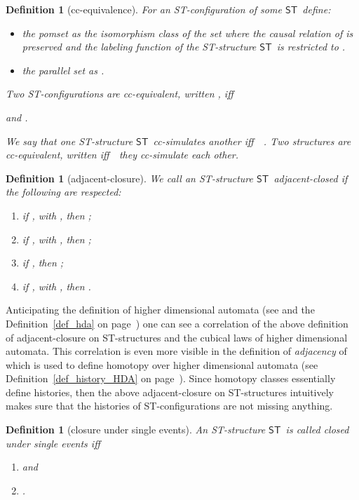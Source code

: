 \documentclass[submission,copyright,creativecommons]{eptcs}
\newtheorem{definition}[theorem]{Definition}
\newcommand\ST{\ensuremath{\mathsf{ST}}}
\newcommand\ststruct{\ensuremath{\ST}}
\begin{document}
\begin{definition}[cc-equivalence]\label{def_cc_equiv}
For an ST-configuration  of some \ST\ define:
\begin{itemize}
\item the \emph{pomset} as  the isomorphism class of the set  where the causal relation  of  is preserved and the labeling function of the ST-structure \ST\ is restricted to .

\item the \emph{parallel set} as .
\end{itemize}
Two ST-configurations are cc-equivalent, written , iff

\centerline{ and .}

\noindent We say that one ST-structure \ST\ cc-simulates another  iff\ \ . Two structures are cc-equivalent, written  iff\ \ they cc-simulate each other.
\end{definition}


\begin{definition}[adjacent-closure]\label{def_adj_ST}
We call an ST-structure \ststruct\ \emph{adja\-cent-closed} if the following are respected:
\begin{enumerate}
  \item if , with , then ;
  \item if , with , then ;
\item if , then ;
  \item if , with , then .
\end{enumerate}
\end{definition}

Anticipating the definition of higher dimensional automata (see \cite{pratt91hda,Pratt00HDArev,Glabbeek06HDA} and the Definition~\ref{def_hda} on page~\pageref{def_hda}) one can see a correlation of the above definition of adjacent-closure on ST-structures and the cubical laws of higher dimensional automata. This correlation is even more visible in the definition of \textit{adjacency} of \cite[Def.19]{Glabbeek06HDA} which is used to define homotopy over higher dimensional automata (see Definition~\ref{def_history_HDA} on page~\pageref{def_history_HDA}). Since homotopy classes essentially define histories, then the above adjacent-closure on ST-structures intuitively makes sure that the histories of ST-configurations are not missing anything.



\begin{definition}[closure under single events]\label{def_closeSingleEv}
An ST-structure \ststruct\ is called \emph{closed under single events} 
iff 
\begin{enumerate}
\item  and
\item .
\end{enumerate}
\end{definition}
\end{document}
